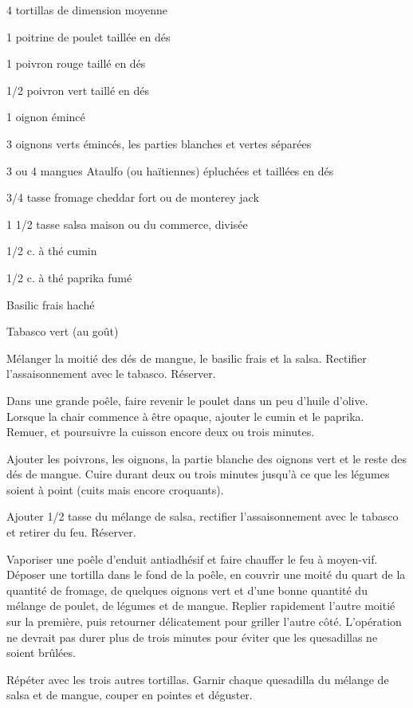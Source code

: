 


\totaltime{}


\begin{ingredients}
    \item 4 tortillas de dimension moyenne
    \item 1 poitrine de poulet taillée en dés
    \item 1 poivron rouge taillé en dés
    \item 1/2 poivron vert taillé en dés
    \item 1 oignon émincé
    \item 3 oignons verts émincés, les parties blanches et vertes séparées
    \item 3 ou 4 mangues Ataulfo (ou haïtiennes) épluchées et taillées en dés
    \item 3/4 tasse fromage cheddar fort ou de monterey jack
    \item 1 1/2 tasse salsa maison ou du commerce, divisée
    \item 1/2 c. à thé cumin
    \item 1/2 c. à thé paprika fumé
    \item Basilic frais haché
    \item Tabasco vert (au goût)
\end{ingredients}

\begin{steps}
    \item Mélanger la moitié des dés de mangue, le basilic frais et la salsa. Rectifier l'assaisonnement avec le tabasco. Réserver.
    \item Dans une grande poêle, faire revenir le poulet dans un peu d'huile d'olive. Lorsque la chair commence à être opaque, ajouter le cumin et le paprika. Remuer, et poursuivre la cuisson encore deux ou trois minutes.
    \item Ajouter les poivrons, les oignons, la partie blanche des oignons vert et le reste des dés de mangue. Cuire durant deux ou trois minutes jusqu'à ce que les légumes soient à point (cuits mais encore croquants).
    \item Ajouter 1/2 tasse du mélange de salsa, rectifier l'assaisonnement avec le tabasco et retirer du feu. Réserver.
    \item Vaporiser une poêle d'enduit antiadhésif et faire chauffer le feu à moyen-vif. Déposer une tortilla dans le fond de la poêle, en couvrir une moité du quart de la quantité de fromage, de quelques oignons vert et d'une bonne quantité du mélange de poulet, de légumes et de mangue. Replier rapidement l'autre moitié sur la première, puis retourner délicatement pour griller l'autre côté. L'opération ne devrait pas durer plus de trois minutes pour éviter que les quesadillas ne soient brûlées.
    \item Répéter avec les trois autres tortillas. Garnir chaque quesadilla du mélange de salsa et de mangue, couper en pointes et déguster.
\end{steps}
